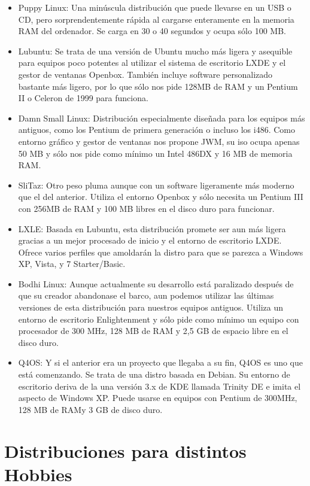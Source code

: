 \documentclass[11pt, a4paper]{report}
\begin{document}
\begin{itemize}
\item Puppy Linux: Una minúscula distribución que puede llevarse en un USB o
  CD, pero sorprendentemente rápida al cargarse enteramente en la memoria RAM
  del ordenador. Se carga en 30 o 40 segundos y ocupa sólo 100 MB.
\item Lubuntu: Se trata de una versión de Ubuntu mucho más ligera y asequible
  para equipos poco potentes al utilizar el sistema de escritorio LXDE y el
  gestor de ventanas Openbox. También incluye software personalizado bastante
  más ligero, por lo que sólo nos pide 128MB de RAM y un Pentium II o Celeron
  de 1999 para funciona.
\item Damn Small Linux: Distribución especialmente diseñada para los equipos
  más antiguos, como los Pentium de primera generación o incluso los i486. Como
  entorno gráfico y gestor de ventanas nos propone JWM, su iso ocupa apenas 50
  MB y sólo nos pide como mínimo un Intel 486DX y 16 MB de memoria RAM.
\item SliTaz: Otro peso pluma aunque con un software ligeramente más moderno
  que el del anterior. Utiliza el entorno Openbox y sólo necesita un Pentium III con 256MB de RAM y 100 MB libres en el disco duro para funcionar.
\item LXLE: Basada en Lubuntu, esta distribución promete ser aun más ligera
  gracias a un mejor procesado de inicio y el entorno de escritorio LXDE.
  Ofrece varios perfiles que amoldarán la distro para que se parezca a Windows
  XP, Vista, y 7 Starter/Basic.
\item Bodhi Linux: Aunque actualmente su desarrollo está paralizado después de
  que su creador abandonase el barco, aun podemos utilizar las últimas
  versiones de esta distribución para nuestros equipos antiguos. Utiliza un
  entorno de escritorio Enlightenment y sólo pide como mínimo un equipo con
  procesador de 300 MHz, 128 MB de RAM y 2,5 GB de espacio libre en el disco
  duro.
\item Q4OS: Y si el anterior era un proyecto que llegaba a su fin, Q4OS es uno
  que está comenzando. Se trata de una distro basada en Debian. Su entorno de
  escritorio deriva de la una versión 3.x de KDE llamada Trinity DE e imita el
  aspecto de Windows XP. Puede usarse en equipos con Pentium de 300MHz, 128 MB
  de RAMy 3 GB de disco duro.
\end{itemize}

\section*{Distribuciones para distintos Hobbies}
\end{document}
